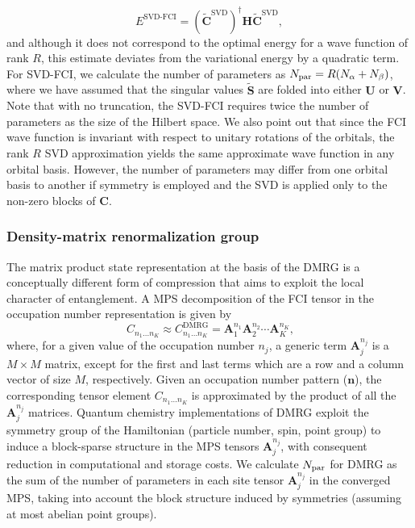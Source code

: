 \documentclass[aip,jcp,amsmath,amssymb, preprint]{revtex4-1}
\begin{document}
\begin{equation}
E^{\text{SVD-FCI}} =(\widetilde{ \mathbf{C} }^{\text{SVD}})^{\dagger} \mathbf{H} \widetilde{ \mathbf{C} }^{\text{SVD}} ,
\end{equation}
and although it does not correspond to the optimal energy for a wave function of rank $R$, this estimate deviates from the variational energy by a quadratic term.
For SVD-FCI, we calculate the number of parameters as $N_{\rm{par}} = R (N_{\alpha} + N_{\beta})$, where we have assumed that the singular values $\widetilde{\mathbf{S}}$ are folded into either $\mathbf{U}$ or $\mathbf{V}$.
Note that with no truncation, the SVD-FCI requires twice the number of parameters as the size of the Hilbert space.
We also point out that since the FCI wave function is invariant with respect to unitary rotations of the orbitals, the rank $R$ SVD approximation yields the same approximate wave function in any orbital basis.
However, the number of parameters may differ from one orbital basis to another if symmetry is employed and the SVD is applied only to the non-zero blocks of $\mathbf{C}$.

\subsubsection{Density-matrix renormalization group}

The matrix product state representation at the basis of the DMRG is a conceptually different form of compression that aims to exploit the local character of entanglement. 
A MPS decomposition of the FCI tensor in the occupation number representation is given by
\begin{equation}
\
C_{n_{1} \ldots n_{K}} \approx C_{n_{1} \ldots n_{K}} ^\mathrm{DMRG}= 
\mathbf{A}^{n_1}_1 \mathbf{A}^{n_2}_2 \cdots \mathbf{A}^{n_K}_K,
\end{equation}
where, for a given value of the occupation number $n_j$, a generic term $\mathbf{A}^{n_j}_j$ is a $M \times M$ matrix, except for the first and last terms which are a row and a column vector of size $M$, respectively.
Given an occupation number pattern ($\mathbf{n}$), the corresponding tensor element $C_{n_{1} \ldots n_{K}}$ is approximated by the product of all the $\mathbf{A}^{n_j}_j$ matrices.
Quantum chemistry implementations of DMRG exploit the symmetry group of the Hamiltonian (particle number, spin, point group) to induce a block-sparse structure in the MPS tensors $\mathbf{A}^{n_j}_j$, with consequent reduction in computational and storage costs.
We calculate $N_{\rm{par}}$ for DMRG as the sum of the number of parameters in each site tensor $\mathbf{A}^{n_j}_j$ in the converged MPS, taking into account the block structure induced by symmetries (assuming at most abelian point groups).
\end{document}
